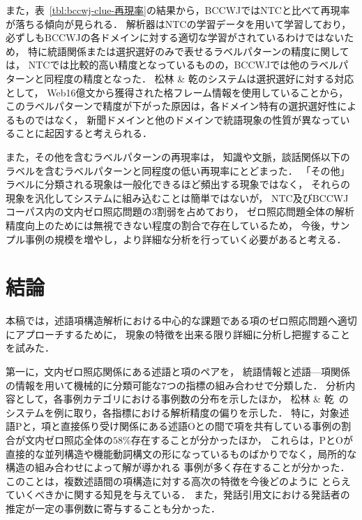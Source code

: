 \documentclass[japanese]{jnlp_1.4}
\begin{document}
また，表~\ref{tbl:bccwj-clue-再現率}の結果から，BCCWJではNTCと比べて再現率が落ちる傾向が見られる．
解析器はNTCの学習データを用いて学習しており，必ずしもBCCWJの各ドメインに対する適切な学習がされているわけではないため，
特に統語関係または選択選好のみで表せるラベルパターンの精度に関しては，
NTCでは比較的高い精度となっているものの，BCCWJでは他のラベルパターンと同程度の精度となった．
松林 \& 乾のシステムは選択選好に対する対応として，
Web16億文から獲得された格フレーム情報を使用していることから，
このラベルパターンで精度が下がった原因は，各ドメイン特有の選択選好性によるものではなく，
新聞ドメインと他のドメインで統語現象の性質が異なっていることに起因すると考えられる．

また，その他を含むラベルパターンの再現率は，
知識や文脈，談話関係以下のラベルを含むラベルパターンと同程度の低い再現率にとどまった．
「その他」ラベルに分類される現象は一般化できるほど頻出する現象ではなく，
それらの現象を汎化してシステムに組み込むことは簡単ではないが，
NTC及びBCCWJコーパス内の文内ゼロ照応問題の3割弱を占めており，
ゼロ照応問題全体の解析精度向上のためには無視できない程度の割合で存在しているため，
今後，サンプル事例の規模を増やし，より詳細な分析を行っていく必要があると考える．


\section{結論}

本稿では，述語項構造解析における中心的な課題である項のゼロ照応問題へ適切にアプローチするために，
現象の特徴を出来る限り詳細に分析し把握することを試みた．

第一に，文内ゼロ照応関係にある述語と項のペアを，
統語情報と述語—項関係の情報を用いて機械的に分類可能な7つの指標の組み合わせで分類した．
分析内容として，各事例カテゴリにおける事例数の分布を示したほか，
松林 \& 乾~\cite{matsubayashi2014}のシステムを例に取り，各指標における解析精度の偏りを示した．
特に，対象述語Pと，項と直接係り受け関係にある述語Oとの間で項を共有している事例の割合が文内ゼロ照応全体の$58\%$存在することが分かったほか，
これらは，PとOが直接的な並列構造や機能動詞構文の形になっているものばかりでなく，局所的な構造の組み合わせによって解が導かれる
事例が多く存在することが分かった．このことは，複数述語間の項構造に対する高次の特徴を今後どのように
とらえていくべきかに関する知見を与えている．
また，発話引用文における発話者の推定が一定の事例数に寄与することも分かった．
\end{document}
